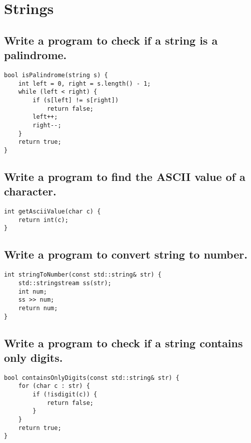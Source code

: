 \section{Strings}

\subsection{Write a program to check if a string is a palindrome.}
\begin{tcolorbox}[title=]
\begin{verbatim}
bool isPalindrome(string s) {
    int left = 0, right = s.length() - 1;
    while (left < right) {
        if (s[left] != s[right])
            return false;
        left++;
        right--;
    }
    return true;
}
\end{verbatim}
\end{tcolorbox}

\subsection{Write a program to find the ASCII value of a character.}
\begin{tcolorbox}[title=]
\begin{verbatim}
int getAsciiValue(char c) {
    return int(c);
}
\end{verbatim}
\end{tcolorbox}

\subsection{Write a program to convert string to number.}
\begin{tcolorbox}[title=]
\begin{verbatim}
int stringToNumber(const std::string& str) {
    std::stringstream ss(str);
    int num;
    ss >> num;
    return num;
}
\end{verbatim}
\end{tcolorbox}

\subsection{Write a program to check if a string contains only digits.}
\begin{tcolorbox}[title=]
\begin{verbatim}
bool containsOnlyDigits(const std::string& str) {
    for (char c : str) {
        if (!isdigit(c)) {
            return false;
        }
    }
    return true;
}
\end{verbatim}
\end{tcolorbox}

